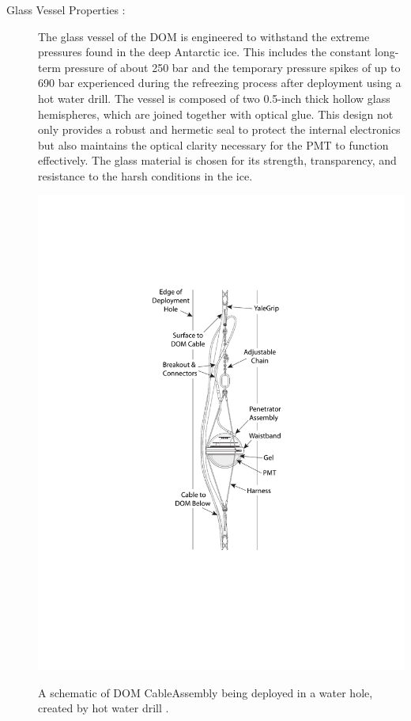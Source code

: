 \begin{description}

    \item[Glass Vessel Properties :] The glass vessel of the DOM is engineered to withstand the extreme pressures found in the deep Antarctic ice. This includes the constant long-term pressure of about 250 bar and the temporary pressure spikes of up to 690 bar experienced during the refreezing process after deployment using a hot water drill. The vessel is composed of two 0.5-inch thick hollow glass hemispheres, which are joined together with optical glue. This design not only provides a robust and hermetic seal to protect the internal electronics but also maintains the optical clarity necessary for the PMT to function effectively. The glass material is chosen for its strength, transparency, and resistance to the harsh conditions in the ice.

    \begin{marginfigure}
        \includegraphics{./figures/nu_in_icecube/domfig2a-CableAssembly.pdf}
        \caption{A schematic of DOM CableAssembly being deployed in a water hole, created by hot water drill \cite{Aartsen_2017}.}
    \end{marginfigure}
    

\end{description}
